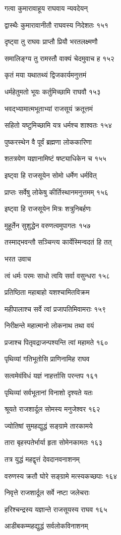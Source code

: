 गत्वा कुमारावाहूय राघवाय न्यवदेयन्

द्वास्थैः कुमारावानीतौ राघवस्य निदेशतः १५१

दृष्ट्वा तु राघवः प्राप्तौ प्रियौ भरतलक्ष्मणौ

समालिङ्ग्य तु रामस्तौ वाक्यं चेदमुवाच ह १५२

कृतं मया यथातथ्यं द्विजकार्यमनुत्तमं

धर्महेतुमतो भूयः कर्तुमिच्छामि राघवौ १५३

भवद्भ्यामात्मभूताभ्यां राजसूयं क्रतूत्तमं

सहितो यष्टुमिच्छामि यत्र धर्मश्च शाश्वतः १५४

पुष्करस्थेन वै पूर्वं ब्रह्मणा लोककारिणा

शतत्रयेण यज्ञानामिष्टं षष्ट्याधिकेन च १५५

इष्ट्वा हि राजसूयेन सोमो धर्मेण धर्मवित्

प्राप्तः सर्वेषु लोकेषु कीर्तिस्थानमनुत्तमम् १५६

इष्ट्वा हि राजसूयेन मित्रः शत्रुनिबर्हणः

मुहूर्तेन सुशुद्धेन वरुणत्वमुपागतः १५७

तस्माद्भवन्तौ सञ्चिन्त्य कार्येस्मिन्वदतं हि तत्

भरत उवाच

त्वं धर्मः परमः साधो त्वयि सर्वा वसुन्धरा १५८

प्रतिष्ठिता महाबाहो यशश्चामितविक्रम

महीपालाश्च सर्वे त्वां प्रजापतिमिवामराः १५९

निरीक्षन्ते महात्मानो लोकनाथ तथा वयं

प्रजाश्च पितृवद्राजन्पश्यन्ति त्वां महामते १६०

पृथिव्यां गतिभूतोसि प्राणिनामिह राघव

सत्वमेवंविधं यज्ञं नाहर्त्तासि परन्तप १६१

पृथिव्यां सर्वभूतानां विनाशो दृश्यते यतः

श्रूयते राजशार्दूल सोमस्य मनुजेश्वर १६२

ज्योतिषां सुमहद्युद्धं सङ्ग्रामे तारकामये

तारा बृहस्पतेर्भार्या हृता सोमेनकामतः १६३

तत्र युद्धं महद्वृत्तं देवदानवनाशनम्

वरुणस्य क्रतौ घोरे सङ्ग्रामे मत्स्यकच्छपाः १६४

निवृत्ते राजशार्दूल सर्वे नष्टा जलेचराः

हरिश्चन्द्रस्य यज्ञान्ते राजसूयस्य राघव १६५

आडीबकम्महद्युद्धं सर्वलोकविनाशनम्

